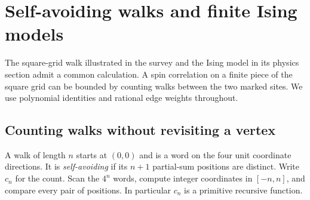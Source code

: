\section{Self-avoiding walks and finite Ising models}
\label{sec:models}

The square-grid walk illustrated in the survey and the Ising model in its physics section admit a common calculation. A spin correlation on a finite piece of the square grid can be bounded by counting walks between the two marked sites. We use polynomial identities and rational edge weights throughout.

\subsection{Counting walks without revisiting a vertex}

A walk of length $n$ starts at $(0,0)$ and is a word on the four unit coordinate directions. It is \emph{self-avoiding} if its $n+1$ partial-sum positions are distinct. Write $c_n$ for the count. Scan the $4^n$ words, compute integer coordinates in $[-n,n]$, and compare every pair of positions. In particular $c_n$ is a primitive recursive function.

